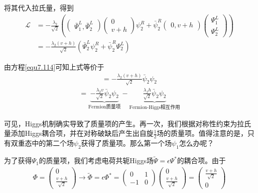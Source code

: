 将其代入拉氏量，得到
\begin{align*}
\mathscr{L}&=-\frac{\lambda_2}{\sqrt{2}}\left(\begin{pmatrix}\bar{\Psi}_1^L,\bar{\Psi}^L_2\end{pmatrix}\begin{pmatrix}0 \\ v+h\end{pmatrix}\psi^R_2+\bar{\psi}^R_2\begin{pmatrix}0,v+h\end{pmatrix}\begin{pmatrix}\Psi^L_1 \\ \Psi^L_2\end{pmatrix}\right)\nonumber\\
&=-\frac{\lambda_2(v+h)}{\sqrt{2}}(\bar{\Psi}_2^L\psi_2^R+\bar{\psi}^R_2\Psi^L_2)
\end{align*}

由方程\eqref{equ7.114}可知上式等价于
\begin{align}
=-\frac{\lambda_2(v+h)}{\sqrt{2}}\bar{\psi}_2\psi_2
\label{equ7.118}
\end{align}
\begin{align}
=\underbrace{-\frac{\lambda_2v}{\sqrt{2}}\bar{\psi}_2\psi_2}_\text{Fermion质量项}-\underbrace{\frac{\lambda_fh}{\sqrt{2}}\bar{\psi}_2\psi_2}_\text{Fermion-Higgs相互作用}
\label{equ7.119}
\end{align}

可见，Higgs机制确实导致了质量项的产生。再一次，我们根据对称性约束为拉氏量添加Higgs耦合项，并在对称破缺后产生出自旋$\frac{1}{2}$场的质量项。值得注意的是，只有双重态中的第二个场$\psi_2$获得了质量项。那么第一个场$\psi_1$怎么办呢？

为了获得$\Psi_1$的质量项，我们考虑电荷共轭Higgs场$\tilde{\Psi}=\epsilon\Psi^*$的耦合项。由于
\begin{align}
\Phi=\begin{pmatrix}0 \\ \frac{v+h}{\sqrt{2}}\end{pmatrix}\rightarrow\tilde{\Phi}=\epsilon\Phi^*=\begin{pmatrix}0 & 1 \\ -1 & 0\end{pmatrix}\begin{pmatrix}0 \\ \frac{v+h}{\sqrt{2}}\end{pmatrix}=\begin{pmatrix} \frac{v+h}{\sqrt{2}} \\ 0\end{pmatrix}
\label{equ7.120}
\end{align}

